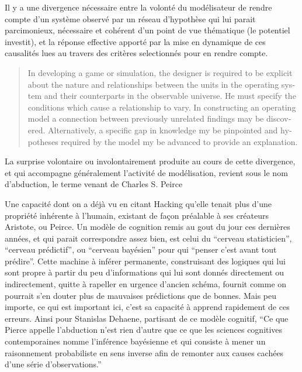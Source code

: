 Il y a une divergence nécessaire entre la volonté du modélisateur de rendre compte d'un système observé par un réseau d'hypothèse qui lui parait parcimonieux, nécessaire et cohérent d'un point de vue thématique (le potentiel investit), et la réponse effective apporté par la mise en dynamique de ces causalités lues au travers des critères selectionnés pour en rendre compte. %

\foreignblockquote{english}[{\cite[219]{Hermann1967}}]{In developing a game or simulation, the designer is required to be explicit about the nature and relationships between the units in the operating system and their counterparts in the observable universe. He must specify the conditions which cause a relationship to vary. In constructing an operating model a connection between previously unrelated findings may be discovered. Alternatively, a specific gap in knowledge my be pinpointed and hypotheses required by the model my be advanced to provide an explanation.} 

La surprise volontaire ou involontairement produite au cours de cette divergence, et qui accompagne généralement l'activité de modélisation, revient sous le nom d'abduction, le terme venant de Charles S. Peirce \autocites{Besse2000, Banos2013, Phan2006, Livet2014} 

Une capacité dont on a déjà vu en citant Hacking \autocites{Hacking1989,Hacking2003, Hacking2006} qu'elle tenait plus d'une propriété inhérente à l'humain, existant de façon préalable à ses créateurs Aristote, ou Peirce. Un modèle de cognition remis au gout du jour ces dernières années, et qui parait correspondre assez bien, est celui du \enquote{cerveau statisticien},  \enquote{cerveau prédictif}, ou \enquote{cerveau bayésien} pour qui \enquote{penser c'est avant tout prédire}. Cette machine à inférer permanente, construisant des logiques qui lui sont propre à partir du peu d'informations qui lui sont donnés directement ou indirectement, quitte à rapeller en urgence d'ancien schéma, fournit comme on pourrait s'en douter plus de mauvaises prédictions que de bonnes. Mais peu importe, ce qui est important ici, c'est sa capacité à apprend rapidement de ces erreurs. 
Ainsi pour Stanislas Dehaene, partisant de ce modèle cognitif, \enquote{Ce que Pierce appelle l'abduction n'est rien d'autre que ce que les sciences cognitives contemporaines nomme l'inférence bayésienne et qui consiste à mener un raisonnement probabiliste en sens inverse afin de remonter aux causes cachées d'une série d'observations.}


